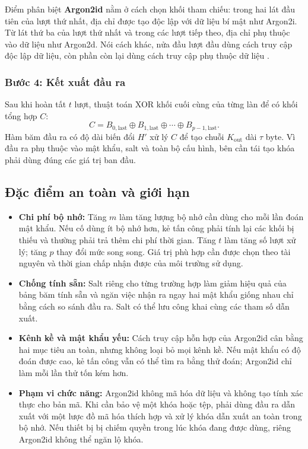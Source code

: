Điểm phân biệt \textbf{Argon2id} nằm ở cách chọn khối tham chiếu: trong hai lát đầu tiên của lượt thứ nhất, địa chỉ được tạo độc lập với dữ liệu bí mật như Argon2i. Từ lát thứ ba của lượt thứ nhất và trong các lượt tiếp theo, địa chỉ phụ thuộc vào dữ liệu như Argon2d. Nói cách khác, nửa đầu lượt đầu dùng cách truy cập độc lập dữ liệu, còn phần còn lại dùng cách truy cập phụ thuộc dữ liệu \cite{argon2rfc}.

\subsubsection{Bước 4: Kết xuất đầu ra}
Sau khi hoàn tất $t$ lượt, thuật toán XOR khối cuối cùng của từng làn để có khối tổng hợp $C$:
\begin{equation}
    C=B_{0,\mathrm{last}}\oplus B_{1,\mathrm{last}}\oplus\cdots\oplus B_{p-1,\mathrm{last}}.
\end{equation}
Hàm băm đầu ra có độ dài biến đổi $H'$ xử lý $C$ để tạo chuỗi $K_{\mathrm{out}}$ dài $\tau$ byte. Vì đầu ra phụ thuộc vào mật khẩu, salt và toàn bộ cấu hình, bên cần tái tạo khóa phải dùng đúng các giá trị ban đầu.

\subsection{Đặc điểm an toàn và giới hạn}
\begin{itemize}
    \item \textbf{Chi phí bộ nhớ:} Tăng $m$ làm tăng lượng bộ nhớ cần dùng cho mỗi lần đoán mật khẩu. Nếu cố dùng ít bộ nhớ hơn, kẻ tấn công phải tính lại các khối bị thiếu và thường phải trả thêm chi phí thời gian. Tăng $t$ làm tăng số lượt xử lý; tăng $p$ thay đổi mức song song. Giá trị phù hợp cần được chọn theo tài nguyên và thời gian chấp nhận được của môi trường sử dụng.
    \item \textbf{Chống tính sẵn:} Salt riêng cho từng trường hợp làm giảm hiệu quả của bảng băm tính sẵn và ngăn việc nhận ra ngay hai mật khẩu giống nhau chỉ bằng cách so sánh đầu ra. Salt có thể lưu công khai cùng các tham số dẫn xuất.
    \item \textbf{Kênh kề và mật khẩu yếu:} Cách truy cập hỗn hợp của Argon2id cân bằng hai mục tiêu an toàn, nhưng không loại bỏ mọi kênh kề. Nếu mật khẩu có độ đoán được cao, kẻ tấn công vẫn có thể tìm ra bằng thử đoán; Argon2id chỉ làm mỗi lần thử tốn kém hơn.
    \item \textbf{Phạm vi chức năng:} Argon2id không mã hóa dữ liệu và không tạo tính xác thực cho bản mã. Khi cần bảo vệ một khóa hoặc tệp, phải dùng đầu ra dẫn xuất với một lược đồ mã hóa thích hợp và xử lý khóa dẫn xuất an toàn trong bộ nhớ. Nếu thiết bị bị chiếm quyền trong lúc khóa đang được dùng, riêng Argon2id không thể ngăn lộ khóa.
\end{itemize}
